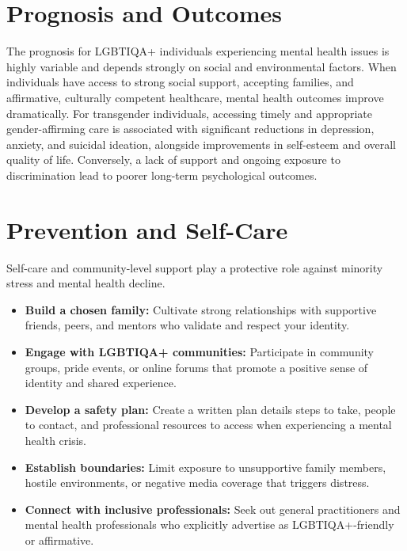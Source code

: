 \section*{Prognosis and Outcomes}
The prognosis for LGBTIQA+ individuals experiencing mental health issues is highly variable and depends strongly on social and environmental factors. When individuals have access to strong social support, accepting families, and affirmative, culturally competent healthcare, mental health outcomes improve dramatically. For transgender individuals, accessing timely and appropriate gender-affirming care is associated with significant reductions in depression, anxiety, and suicidal ideation, alongside improvements in self-esteem and overall quality of life. Conversely, a lack of support and ongoing exposure to discrimination lead to poorer long-term psychological outcomes.

\section*{Prevention and Self-Care}
Self-care and community-level support play a protective role against minority stress and mental health decline.
\begin{itemize}
    \item \textbf{Build a chosen family:} Cultivate strong relationships with supportive friends, peers, and mentors who validate and respect your identity.
    \item \textbf{Engage with LGBTIQA+ communities:} Participate in community groups, pride events, or online forums that promote a positive sense of identity and shared experience.
    \item \textbf{Develop a safety plan:} Create a written plan details steps to take, people to contact, and professional resources to access when experiencing a mental health crisis.
    \item \textbf{Establish boundaries:} Limit exposure to unsupportive family members, hostile environments, or negative media coverage that triggers distress.
    \item \textbf{Connect with inclusive professionals:} Seek out general practitioners and mental health professionals who explicitly advertise as LGBTIQA+-friendly or affirmative.
\end{itemize}


